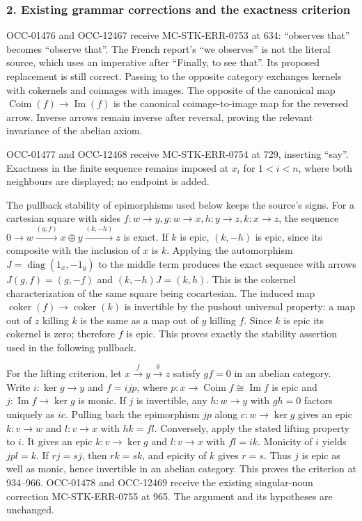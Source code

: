 \subsubsection{2. Existing grammar corrections and the exactness criterion}\label{existing-grammar-corrections-and-the-exactness-criterion}

OCC-01476 and OCC-12467 receive MC-STK-ERR-0753 at 634: ``observes that'' becomes ``observe that''. The French report's ``we observes'' is not the literal source, which uses an imperative after ``Finally, to see that''. Its proposed replacement is still correct. Passing to the opposite category exchanges kernels with cokernels and coimages with images. The opposite of the canonical map \(\operatorname{Coim}(f)\to\operatorname{Im}(f)\) is the canonical coimage-to-image map for the reversed arrow. Inverse arrows remain inverse after reversal, proving the relevant invariance of the abelian axiom.

OCC-01477 and OCC-12468 receive MC-STK-ERR-0754 at 729, inserting ``say''. Exactness in the finite sequence remains imposed at \(x_i\) for \(1<i<n\), where both neighbours are displayed; no endpoint is added.

The pullback stability of epimorphisms used below keeps the source's signs. For a cartesian square with sides \(f:w\to y,g:w\to x,h:y\to z,k:x\to z\), the sequence \(0\to w\xrightarrow{(g,f)}x\oplus y\xrightarrow{(k,-h)}z\) is exact. If \(k\) is epic, \((k,-h)\) is epic, since its composite with the inclusion of \(x\) is \(k\). Applying the automorphism \(J=\operatorname{diag}(1_x,-1_y)\) to the middle term produces the exact sequence with arrows \(J(g,f)=(g,-f)\) and \((k,-h)J=(k,h)\). This is the cokernel characterization of the same square being cocartesian. The induced map \(\operatorname{coker}(f)\to\operatorname{coker}(k)\) is invertible by the pushout universal property: a map out of \(z\) killing \(k\) is the same as a map out of \(y\) killing \(f\). Since \(k\) is epic its cokernel is zero; therefore \(f\) is epic. This proves exactly the stability assertion used in the following pullback.

For the lifting criterion, let \(x\xrightarrow f y\xrightarrow g z\) satisfy \(gf=0\) in an abelian category. Write \(i:\ker g\to y\) and \(f=i j p\), where \(p:x\to\operatorname{Coim}f\cong\operatorname{Im}f\) is epic and \(j:\operatorname{Im}f\to\ker g\) is monic. If \(j\) is invertible, any \(h:w\to y\) with \(gh=0\) factors uniquely as \(ic\). Pulling back the epimorphism \(jp\) along \(c:w\to\ker g\) gives an epic \(k:v\to w\) and \(l:v\to x\) with \(hk=fl\). Conversely, apply the stated lifting property to \(i\). It gives an epic \(k:v\to\ker g\) and \(l:v\to x\) with \(fl=ik\). Monicity of \(i\) yields \(jpl=k\). If \(rj=sj\), then \(rk=sk\), and epicity of \(k\) gives \(r=s\). Thus \(j\) is epic as well as monic, hence invertible in an abelian category. This proves the criterion at 934--966. OCC-01478 and OCC-12469 receive the existing singular-noun correction MC-STK-ERR-0755 at 965. The argument and its hypotheses are unchanged.

